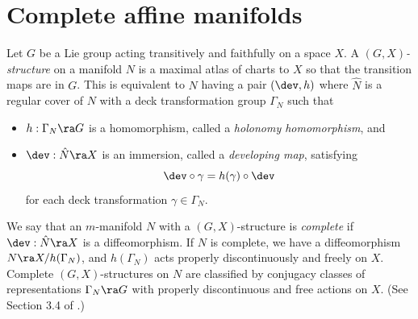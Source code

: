 %
%
%


\section{Complete affine manifolds} \label{sec:affine} 



Let $G$ be a Lie group acting transitively and faithfully on 
a space $X$. 
A {\em $(G, X)$-structure} on a manifold $N$ is a maximal atlas of charts to $X$ so that 
the transition maps are in $G$. 
This is equivalent to
$N$ having a pair $(\dev, h)$ where 
$\hat N$  is a regular cover of $N$ with a deck transformation group $\Gamma_N$
such that
\begin{itemize} 
	\item $h:\Gamma_N \ra G$ is a homomorphism, called a {\em holonomy homomorphism}, and 
	\item $\dev: \hat N \ra X$ is an immersion,  
	called a {\em developing map}, satisfying 
	\[\dev \circ \gamma = h(\gamma)\circ \dev \]
 for each deck transformation  $\gamma \in \Gamma_N$.
\end{itemize}


We say that an $m$-manifold $N$ 
with a $(G, X)$-structure  is {\em complete} if $\dev: \hat N \ra X$ is a diffeomorphism. 
If $N$ is complete, 
we have a diffeomorphism 
$N \ra X/h(\Gamma_N)$, and $h(\Gamma_N)$ acts properly discontinuously and freely on $X$. Complete $(G, X)$-structures on $N$ are classified 
by conjugacy classes of representations $\Gamma_N \ra G$ with properly discontinuous and free actions on $X$. 
(See Section 3.4 of \cite{Thurston97}.)

